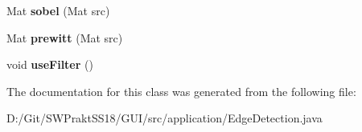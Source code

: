 \begin{DoxyCompactItemize}
\mbox{\label{classapplication_1_1_edge_detection_aef4c15983989cabe37224fb07074ecea}} 
Mat {\bfseries sobel} (Mat src)
\item 
\mbox{\label{classapplication_1_1_edge_detection_a09565acdb7b23de8a6f834512b1bb706}} 
Mat {\bfseries prewitt} (Mat src)
\item 
\mbox{\label{classapplication_1_1_edge_detection_a5ceee1ac9f4c15852aaa1d4909edc31b}} 
void {\bfseries use\+Filter} ()
\end{DoxyCompactItemize}


The documentation for this class was generated from the following file\+:\begin{DoxyCompactItemize}
\item 
D\+:/\+Git/\+S\+W\+Prakt\+S\+S18/\+G\+U\+I/src/application/Edge\+Detection.\+java\end{DoxyCompactItemize}
